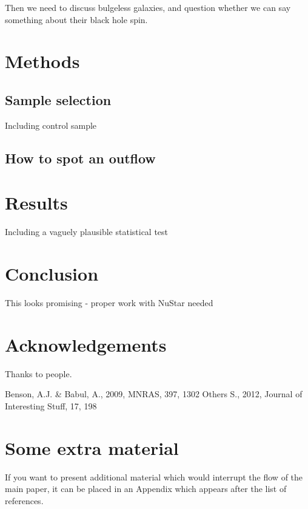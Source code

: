 \documentclass[a4paper,fleqn,usenatbib]{mnras}
\begin{document}
Then we need to discuss bulgeless galaxies, and question whether we can say something about their black hole spin.

\section{Methods}
\subsection{Sample selection}
Including control sample
\subsection{How to spot an outflow}

\section{Results}
Including a vaguely plausible statistical test

\section{Conclusion}
This looks promising - proper work with NuStar needed

\section*{Acknowledgements}
Thanks to people. 




%


\begin{thebibliography}{99}
Benson, A.J. \& Babul, A., 2009, MNRAS, 397, 1302
Others S., 2012, Journal of Interesting Stuff, 17, 198
\end{thebibliography}



\appendix

\section{Some extra material}

If you want to present additional material which would interrupt the flow of the main paper,
it can be placed in an Appendix which appears after the list of references.



\bsp	%
\label{lastpage}
\end{document}
